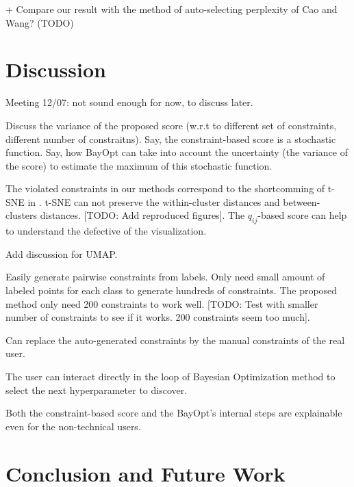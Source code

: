 + Compare our result with the method of auto-selecting perplexity of Cao and Wang? (TODO)



\section{Discussion}
Meeting 12/07: not sound enough for now, to discuss later.

\par
Discuss the variance of the proposed score (w.r.t to different set of constraints, different number of constraitns).
Say, the constraint-based score is a stochastic function.
Say, how BayOpt can take into account the uncertainty (the variance of the score) to estimate the maximum of this stochastic function.


\par
The violated constraints in our methods correspond to the shortcomming of t-SNE in \cite{wattenberg2016use}.
t-SNE can not preserve the within-cluster distances and between-clusters distances.
[TODO: Add reproduced figures].
The $q_{ij}$-based score can help to understand the defective of the visualization.

\par
Add discussion for UMAP.

\par
Easily generate pairwise constraints from labels.
  Only need small amount of labeled points for each class to generate hundreds of constraints.
  The proposed method only need 200 constraints to work well.
  [TODO: Test with smaller number of constraints to see if it works. 200 constraints seem too much].

\par
Can replace the auto-generated constraints by the manual constraints of the real user.

\par
The user can interact directly in the loop of Bayesian Optimization method to select the next hyperparameter to discover.


\par
Both the constraint-based score and the BayOpt's internal steps are explainable even for the non-technical users. 



\section{Conclusion and Future Work}


